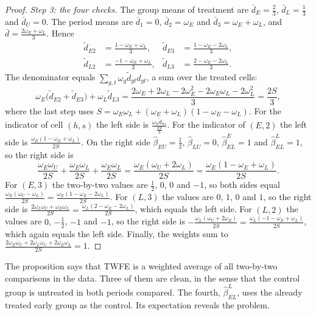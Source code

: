\begin{proof}
\emph{Step 3: the four checks.} The group means of treatment are $\bar d_E=\frac{2}{3}$, $\bar d_L=\frac{1}{3}$ and
$\bar d_U=0$. The period means are $\bar d_1=0$, $\bar d_2=\omega_E$ and $\bar d_3=\omega_E+\omega_L$, and
$\bar d=\frac{2\omega_E+\omega_L}{3}$. Hence
\begin{align*}
\tilde d_{E2}&=\frac{1-\omega_E+\omega_L}{3}, & \tilde d_{E3}&=\frac{1-\omega_E-2\omega_L}{3},\\
\tilde d_{L2}&=\frac{-1-\omega_E+\omega_L}{3}, & \tilde d_{L3}&=\frac{2-\omega_E-2\omega_L}{3}.
\end{align*}
The denominator equals $\sum_{g,t}\omega_g\tilde d_{gt}d_{gt}$, a sum over the treated cells:
\begin{equation*}
\omega_E\big(\tilde d_{E2}+\tilde d_{E3}\big)+\omega_L\tilde d_{L3}
=\frac{2\omega_E+2\omega_L-2\omega_E^2-2\omega_E\omega_L-2\omega_L^2}{3}=\frac{2S}{3},
\end{equation*}
where the last step uses $S=\omega_E\omega_L+(\omega_E+\omega_L)(1-\omega_E-\omega_L)$. For the indicator of
cell $(h,s)$ the left side is $\frac{\omega_h\tilde d_{hs}}{\frac{2S}{3}}$. For the indicator of $(E,2)$ the left side
is $\frac{\omega_E(1-\omega_E+\omega_L)}{2S}$. On the right side $\hat\beta_{EU}=\frac{1}{2}$,
$\hat\beta_{LU}=0$, $\hat\beta^{E}_{EL}=1$ and $\hat\beta^{L}_{EL}=1$, so the right side is
\begin{equation*}
\frac{\omega_E\omega_U}{2S}+\frac{\omega_E\omega_L}{2S}+\frac{\omega_E\omega_L}{2S}
=\frac{\omega_E(\omega_U+2\omega_L)}{2S}=\frac{\omega_E(1-\omega_E+\omega_L)}{2S}.
\end{equation*}
For $(E,3)$ the two-by-two values are $\frac{1}{2}$, $0$, $0$ and $-1$, so both sides equal
$\frac{\omega_E(\omega_U-\omega_L)}{2S}=\frac{\omega_E(1-\omega_E-2\omega_L)}{2S}$. For $(L,3)$ the values are
$0$, $1$, $0$ and $1$, so the right side is $\frac{2\omega_L\omega_U+\omega_E\omega_L}{2S}=\frac{\omega_L(2-\omega_E-2\omega_L)}{2S}$,
which equals the left side. For $(L,2)$ the values are $0$, $-\frac{1}{2}$, $-1$ and $-1$, so the right side is
$-\frac{\omega_L(\omega_U+2\omega_E)}{2S}=\frac{\omega_L(-1-\omega_E+\omega_L)}{2S}$, which again equals the left
side. Finally, the weights sum to $\frac{2\omega_E\omega_U+2\omega_L\omega_U+2\omega_E\omega_L}{2S}=1$.
\end{proof}

The proposition says that TWFE is a weighted average of all two-by-two comparisons in the data. Three of them are
clean, in the sense that the control group is untreated in both periods compared. The fourth, $\hat\beta^{L}_{EL}$,
uses the already treated early group as the control. Its expectation reveals the problem.

